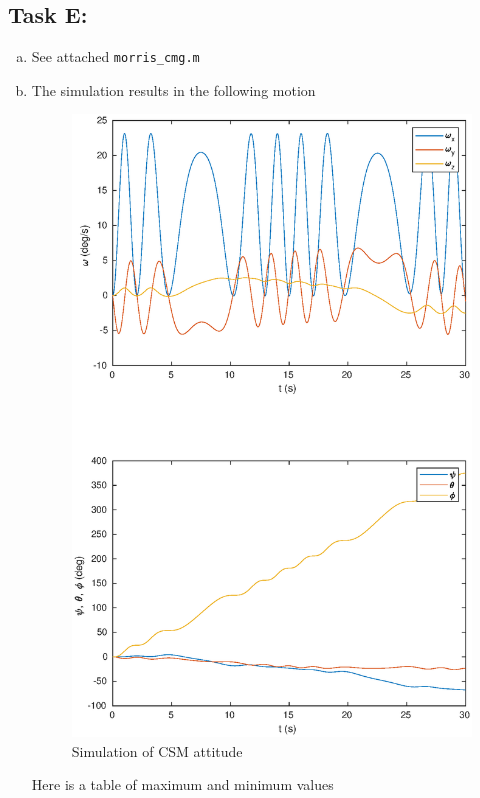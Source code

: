 \documentclass[a4paper]{article}
\begin{document}
\subsection*{Task E:}%
\begin{enumerate}[a.]
  \item See attached \texttt{morris\_cmg.m}
  \item The simulation results in the following motion
    \begin{figure}[H]
    \begin{center}
      \includegraphics[scale=0.7]{task_e_b.eps}
    \end{center}
    \caption{Simulation of CSM attitude}
    \end{figure}
    Here is a table of maximum and minimum values

\end{enumerate}
\end{document}
